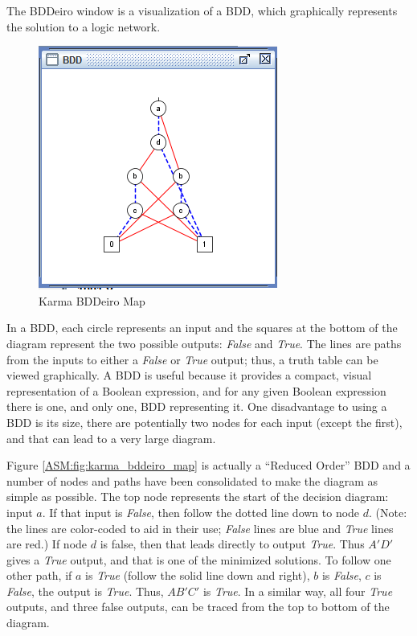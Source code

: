 The BDDeiro window is a visualization of a \ac{BDD}, which graphically represents the solution to a logic network. 

\begin{figure}[H]
	\centering
	\includegraphics[width=\maxwidth{.95\linewidth}]{gfx/07_06}
	\caption{Karma BDDeiro Map}
	\label{fig:07_06}
\end{figure}

In a \ac{BDD}, each circle represents an input and the squares at the bottom of the diagram represent the two possible outputs: \emph{False} and \emph{True}. The lines are paths from the inputs to either a \emph{False} or \emph{True} output; thus, a truth table can be viewed graphically. A \ac{BDD} is useful because it provides a compact, visual representation of a Boolean expression, and for any given Boolean expression there is one, and only one, \ac{BDD} representing it. One disadvantage to using a \ac{BDD} is its size, there are potentially two nodes for each input (except the first), and that can lead to a very large diagram.

Figure \ref{ASM:fig:karma_bddeiro_map} is actually a ``Reduced Order'' \ac{BDD} and a number of nodes and paths have been consolidated to make the diagram as simple as possible. The top node represents the start of the decision diagram: input $ a $. If that input is \emph{False}, then follow the dotted line down to node $ d $. (Note: the lines are color-coded to aid in their use; \emph{False} lines are blue and \emph{True} lines are red.) If node $ d $ is false, then that leads directly to output \emph{True}. Thus $ A'D' $ gives a \emph{True} output, and that is one of the minimized solutions. To follow one other path, if $ a $ is \emph{True} (follow the solid line down and right), $ b $ is \emph{False}, $ c $ is \emph{False}, the output is \emph{True}. Thus, $ AB'C' $ is \emph{True}. In a similar way, all four \emph{True} outputs, and three false outputs, can be traced from the top to bottom of the diagram. 

